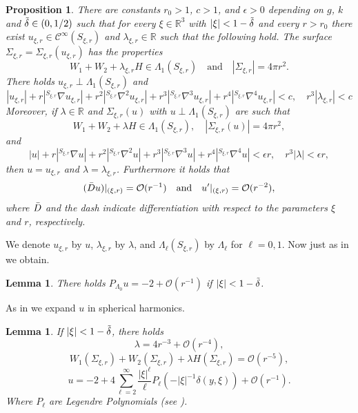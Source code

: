 \documentclass[12pt,a4paper]{amsart}
\theoremstyle{plain}
\newtheorem{proposition}[theorem]{Proposition}
\newtheorem{lemma}[theorem]{Lemma}
\theoremstyle{definition}
\begin{document}
\begin{proposition}\label{17EK}
    There  are constants $r_0 > 1$, $c > 1$, and $\epsilon > 0$ depending on $g$, $k$ and $\Tilde{\delta} \in (0, 1/2)$ such that for every $ \xi \in \mathbb{R}^3$ with $|\xi| < 1 - \Tilde{\delta} $ and every $r > r_0$ there exist \(u_{\xi,r} \in \mathcal{C}^{\infty}(S_{\xi,r})\)
and \(\lambda_{\xi,r} \in \mathbb{R}\) such that the following hold. The surface
\(\Sigma_{\xi,r} = \Sigma_{\xi,r}(u_{\xi,r})\)
has the properties
\[
W_1 +W_2+ \lambda_{\xi,r} H \in \Lambda_1(S_{\xi,r}) \quad \text{and} \quad |\Sigma_{\xi,r}| = 4 \pi r^2.
\]
There holds \(u_{\xi,r} \perp \Lambda_1(S_{\xi,r})\) and
\[
|u_{\xi,r}| + r | ^{S_{\xi,r}}\nabla u_{\xi,r}| + r^2 |^{S_{\xi,r}}\nabla^2 u_{\xi,r}| + r^3 |^{S_{\xi,r}}\nabla^3 u_{\xi,r}| + r^4 |^{S_{\xi,r}}\nabla^4 u_{\xi,r}| < c, \quad r^3 |\lambda_{\xi,r}| < c
\]
Moreover, if \(\lambda \in \mathbb{R}\) and \(\Sigma_{\xi,r}(u)\) with \(u \perp \Lambda_1(S_{\xi,r})\) are such that
\[
W_1 +W_2+ \lambda H \in \Lambda_1(S_{\xi,r}), \quad |\Sigma_{\xi,r}(u)| = 4 \pi r^2,
\]
and
\[
|u| + r |^{S_{\xi,r}}\nabla u| + r^2 |^{S_{\xi,r}}\nabla^2 u| + r^3 |^{S_{\xi,r}}\nabla^3 u| + r^4 |^{S_{\xi,r}}\nabla^4 u| < \epsilon r,\quad r^3 |\lambda| < \epsilon r,
\]
then \(u = u_{\xi,r}\) and \(\lambda = \lambda_{\xi,r}\). Furthermore it holds that \[
(\Bar{D}u)|_{(\xi, r)} = \mathcal{O} (r^{-1}) \quad \text{and} \quad u'|_{(\xi, r)} = \mathcal{O} (r^{-2}),
\]
where \(\Bar{D}\) and the dash indicate differentiation with respect to the parameters \(\xi\) and \(r\), respectively.
\end{proposition}
We denote  \(u_{\xi,r}\) by \(u\), \(\lambda_{\xi,r}\) by \(\lambda\), and \(\Lambda_\ell(S_{\xi,r})\) by \(\Lambda_\ell\)
for \(\ell = 0, 1\). Now just as in \cite[Lemma 19]{eichko} we obtain.
\begin{lemma}
    There holds 
    $P_{\Lambda_0} u = -2 + \mathcal{O}(r^{-1}) $  if  $|\xi|<1- \Tilde{\delta}$.
\end{lemma}
As in \cite[Lemma 20]{eichko} we expand $u$ in spherical harmonics.   
\begin{lemma}\label{expansquafoli}
    If \(|\xi| < 1 - \Tilde{\delta}\), there holds
\[
\lambda = 4 r^{-3} + \mathcal{O} (r^{-4}),
\]
\[
W_1(\Sigma_{\xi,r}) + W_2(\Sigma_{\xi,r})+ \lambda H(\Sigma_{\xi,r}) = \mathcal{O} (r^{-5}),
\]
\[
u = -2 + 4 \sum^{\infty}_{\ell= 2} \frac{|\xi|^\ell}{\ell} P_\ell \left(-|\xi|^{-1} \delta (y, \xi) \right) + \mathcal{O}(r^{-1}).
\]
Where $P_\ell$ are Legendre Polynomials (see \cite[Appendix B]{eichko}).
\end{lemma}
\end{document}
